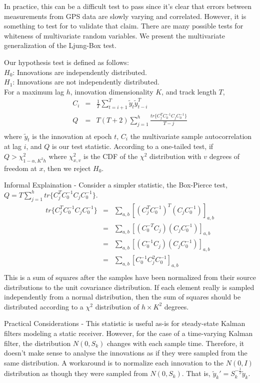 \medskip
{} In practice, this can be a difficult test to pass since it's clear that errors between measurements from GPS data are slowly varying and correlated.  However, it is something to test for to validate that claim.  There are many possible tests for whiteness of multivariate random variables.  We present the multivariate generalization of the Ljung-Box test.

Our hypothesis test is defined as follows:\\
$H_0$: Innovations are independently distributed.\\
$H_1$: Innovations are not independently distributed.\\
For a maximum lag $h$, innovation dimensionality $K$, and track length $T$,
\begin{eqnarray*}
C_i &=& \frac{1}{T}\sum_{t=i+1}^T\tilde{y}_t\tilde{y}_{t-i}^T\\
Q &=& T(T+2)\sum_{j=1}^h \frac{tr\{C_j^T C_0^{-1} C_j C_0^{-1}\}}{T-j}\\
\end{eqnarray*}
where $\tilde{y}_t$ is the innovation at epoch $t$, $C_i$ the multivariate sample autocorrelation at lag $i$, and $Q$ is our test statistic.
According to a one-tailed test, if $Q > \chi^2_{1-\alpha,K^2h}$ where $\chi^2_{x,v}$ is the CDF of the $\chi^2$ distribution with $v$ degrees of freedom at $x$, then we reject $H_0$.

\medskip
\noindent Informal Explaination - Consider a simpler statistic, the Box-Pierce test, $Q = T \sum_{j=1}^h tr\{C_j^T C_0^{-1} C_j C_0^{-1}\}$.
\begin{eqnarray*}
tr\{C_j^T C_0^{-1} C_j C_0^{-1}\} &=& \sum_{a,b}[(C_j^T C_0^{-1})^T(C_j C_0^{-1})]_{a,b}\\
 &=& \sum_{a,b}[(C_0^{-T} C_j)(C_j C_0^{-1})]_{a,b}\\
 &=& \sum_{a,b}[(C_0^{-1} C_j)(C_j C_0^{-1})]_{a,b}\\
 &=& \sum_{a,b}[C_0^{-1} C_j^2 C_0^{-1}]_{a,b}\\
\end{eqnarray*}
This is a sum of squares after the samples have been normalized from their source distributions to the unit covariance distribution.  If each element really is sampled independently from a normal distribution, then the sum of squares should be distributed according to a $\chi^2$ distribution of $h \times K^2$ degrees.

\medskip
\noindent Practical Considerations - This statistic is useful as-is for steady-state Kalman filters modeling a static receiver.  However, for the case of a time-varying Kalman filter, the distribution $N(0,S_k)$ changes with each sample time.  Therefore, it doesn't make sense to analyse the innovations as if they were sampled from the same distribution.  A workaround is to normalize each innovation to the $N(0, I)$ distribution as though they were sampled from $N(0,S_k)$.  That is, $\tilde{y}_k' = S_k^{-\frac{1}{2}} \tilde{y}_k$.

